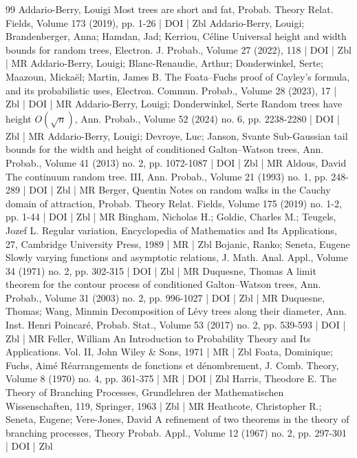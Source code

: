 \begin{thebibliography}{99}
Addario-Berry, Louigi Most trees are short and fat, Probab. Theory Relat. Fields, Volume 173 (2019), pp. 1-26 | DOI | Zbl
Addario-Berry, Louigi; Brandenberger, Anna; Hamdan, Jad; Kerriou, Céline Universal height and width bounds for random trees, Electron. J. Probab., Volume 27 (2022), 118 | DOI | Zbl | MR
Addario-Berry, Louigi; Blanc-Renaudie, Arthur; Donderwinkel, Serte; Maazoun, Mickaël; Martin, James B. The Foata–Fuchs proof of Cayley’s formula, and its probabilistic uses, Electron. Commun. Probab., Volume 28 (2023), 17 | Zbl | DOI | MR
Addario-Berry, Louigi; Donderwinkel, Serte Random trees have height ${O}(\sqrt{n})$, Ann. Probab., Volume 52 (2024) no. 6, pp. 2238-2280 | DOI | Zbl | MR
Addario-Berry, Louigi; Devroye, Luc; Janson, Svante Sub-Gaussian tail bounds for the width and height of conditioned Galton–Watson trees, Ann. Probab., Volume 41 (2013) no. 2, pp. 1072-1087 | DOI | Zbl | MR
Aldous, David The continuum random tree. III, Ann. Probab., Volume 21 (1993) no. 1, pp. 248-289 | DOI | Zbl | MR
Berger, Quentin Notes on random walks in the Cauchy domain of attraction, Probab. Theory Relat. Fields, Volume 175 (2019) no. 1-2, pp. 1-44 | DOI | Zbl | MR
Bingham, Nicholas H.; Goldie, Charles M.; Teugels, Jozef L. Regular variation, Encyclopedia of Mathematics and Its Applications, 27, Cambridge University Press, 1989 | MR | Zbl
Bojanic, Ranko; Seneta, Eugene Slowly varying functions and asymptotic relations, J. Math. Anal. Appl., Volume 34 (1971) no. 2, pp. 302-315 | DOI | Zbl | MR
Duquesne, Thomas A limit theorem for the contour process of conditioned Galton–Watson trees, Ann. Probab., Volume 31 (2003) no. 2, pp. 996-1027 | DOI | Zbl | MR
Duquesne, Thomas; Wang, Minmin Decomposition of Lévy trees along their diameter, Ann. Inst. Henri Poincaré, Probab. Stat., Volume 53 (2017) no. 2, pp. 539-593 | DOI | Zbl | MR
Feller, William An Introduction to Probability Theory and Its Applications. Vol. II, John Wiley \& Sons, 1971 | MR | Zbl
Foata, Dominique; Fuchs, Aimé Réarrangements de fonctions et dénombrement, J. Comb. Theory, Volume 8 (1970) no. 4, pp. 361-375 | MR | DOI | Zbl
Harris, Theodore E. The Theory of Branching Processes, Grundlehren der Mathematischen Wissenschaften, 119, Springer, 1963 | Zbl | MR
Heathcote, Christopher R.; Seneta, Eugene; Vere-Jones, David A refinement of two theorems in the theory of branching processes, Theory Probab. Appl., Volume 12 (1967) no. 2, pp. 297-301 | DOI | Zbl

\end{thebibliography}
